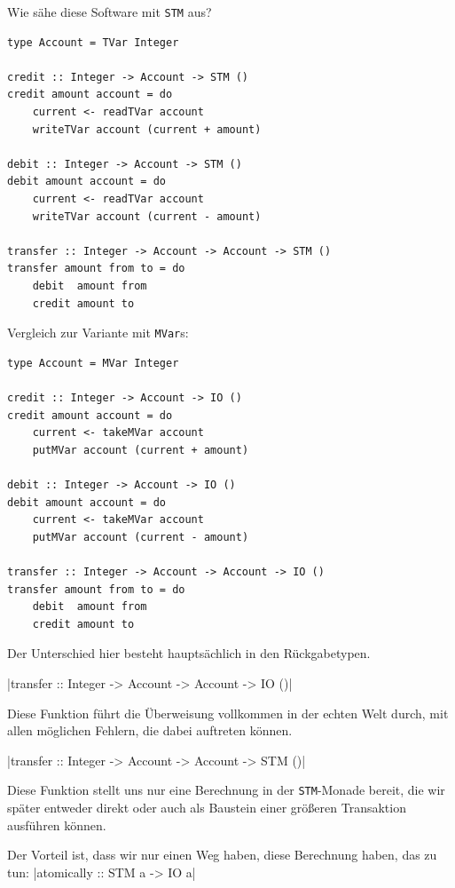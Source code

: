 \documentclass{beamer}
\begin{document}

\begin{frame}[fragile]

Wie sähe diese Software mit \texttt{STM} aus?

\begin{verbatim}
type Account = TVar Integer
 
credit :: Integer -> Account -> STM ()
credit amount account = do
    current <- readTVar account
    writeTVar account (current + amount)
 
debit :: Integer -> Account -> STM ()
debit amount account = do
    current <- readTVar account
    writeTVar account (current - amount)
 
transfer :: Integer -> Account -> Account -> STM ()
transfer amount from to = do
    debit  amount from
    credit amount to
\end{verbatim}
\end{frame}


\begin{frame}[fragile]

Vergleich zur Variante mit \texttt{MVar}s:

\begin{verbatim}
type Account = MVar Integer
 
credit :: Integer -> Account -> IO ()
credit amount account = do
    current <- takeMVar account
    putMVar account (current + amount)
 
debit :: Integer -> Account -> IO ()
debit amount account = do
    current <- takeMVar account
    putMVar account (current - amount)
 
transfer :: Integer -> Account -> Account -> IO ()
transfer amount from to = do
    debit  amount from
    credit amount to
\end{verbatim}
\end{frame}


\begin{frame}[fragile]

Der Unterschied hier besteht hauptsächlich in den Rückgabetypen.\pause

|transfer :: Integer -> Account -> Account -> IO ()|

Diese Funktion führt die Überweisung vollkommen in der echten Welt durch, mit allen
möglichen Fehlern, die dabei auftreten können.\pause

|transfer :: Integer -> Account -> Account -> STM ()|

Diese Funktion stellt uns nur eine Berechnung in der \texttt{STM}-Monade bereit, die wir
später entweder direkt oder auch als Baustein einer größeren Transaktion ausführen können.\pause

Der Vorteil ist, dass wir nur einen Weg haben, diese Berechnung haben, das zu tun:
|atomically :: STM a -> IO a|
\end{frame}
\end{document}
